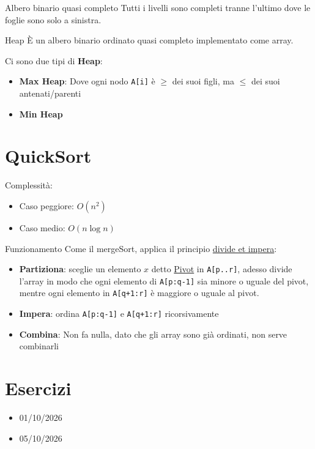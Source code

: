 \documentclass{article}
\begin{document}
\begin{defi}{Albero binario quasi completo}{}
    Tutti i livelli sono completi tranne l'ultimo dove le foglie sono solo a sinistra.
\end{defi}

\begin{defi}{Heap}{}
    È un albero binario ordinato quasi completo implementato come array.
    
    Ci sono due tipi di \textbf{Heap}:
    \begin{itemize}
        \item \textbf{Max Heap}: Dove ogni nodo \texttt{A[i]} è $\ge$ dei suoi figli, ma $\le$ dei suoi antenati/parenti
        \item \textbf{Min Heap}
    \end{itemize}
\end{defi}

\section{QuickSort}
Complessità:
\begin{itemize}
    \item Caso peggiore: $O(n^2)$
    \item Caso medio: $O(n\log n)$
\end{itemize}
\begin{info}{Funzionamento}{}
    Come il mergeSort, applica il principio \underline{divide et impera}:

    \begin{itemize}
        \item \textbf{Partiziona}: sceglie un elemento $x$ detto \underline{Pivot} in \texttt{A[p..r]},
        adesso divide l'array in modo che ogni elemento di \texttt{A[p:q-1]} sia minore o uguale del pivot, 
        mentre ogni elemento in \texttt{A[q+1:r]} è maggiore o uguale al pivot.
        \item \textbf{Impera}: ordina \texttt{A[p:q-1]} e \texttt{A[q+1:r]} ricorsivamente
        \item \textbf{Combina}: Non fa nulla, dato che gli array sono già ordinati, non serve combinarli
    \end{itemize}
\end{info}


\section{Esercizi}
\begin{itemize}
    \item 01/10/2026
    \item 05/10/2026
\end{itemize}
\end{document}
